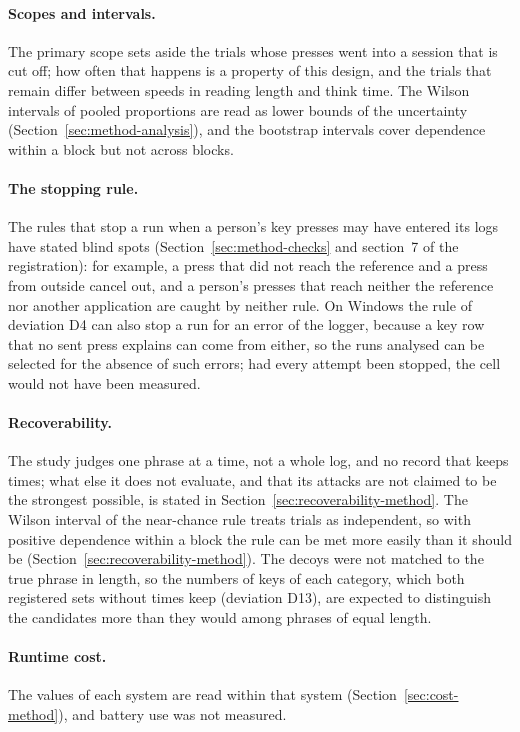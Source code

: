 \paragraph{Scopes and intervals.} The primary scope sets aside the trials whose presses went into a session that is cut
off; how often that happens is a property of this design, and the trials that remain differ between speeds in reading
length and think time. The Wilson intervals of pooled proportions are read as lower bounds of the uncertainty
(Section~\ref{sec:method-analysis}), and the bootstrap intervals cover dependence within a block but not across blocks.

\paragraph{The stopping rule.} The rules that stop a run when a person's key presses may have entered its logs have
stated blind spots (Section~\ref{sec:method-checks} and section~7 of the registration): for example, a press that did
not reach the reference and a press from outside cancel out, and a person's presses that reach neither the reference nor
another application are caught by neither rule. On Windows the rule of deviation D4 can also stop a run for an error of
the logger, because a key row that no sent press explains can come from either, so the runs analysed can be selected for
the absence of such errors; had every attempt been stopped, the cell would not have been measured.

\paragraph{Recoverability.} The study judges one phrase at a time, not a whole log, and no record that keeps times;
what else it does not evaluate, and that its attacks are not claimed to be the strongest possible, is stated in
Section~\ref{sec:recoverability-method}. The Wilson interval of the near-chance rule treats trials as independent, so
with positive dependence within a block the rule can be met more easily than it should be
(Section~\ref{sec:recoverability-method}).
The decoys were not matched to the true phrase in length, so the numbers of
keys of each category, which both registered sets without times keep (deviation D13), are expected to distinguish the
candidates more than they would among phrases of equal length.

\paragraph{Runtime cost.} The values of each system are read within that system (Section~\ref{sec:cost-method}), and
battery use was not measured.
